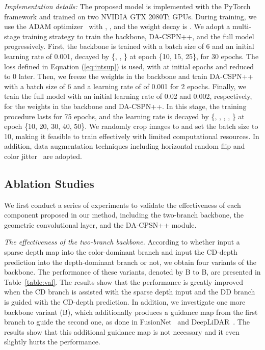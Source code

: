 \documentclass[letterpaper, 10 pt, conference]{ieeeconf}
\begin{document}
\textit{Implementation details:} The proposed model is implemented with the PyTorch~\cite{PyTorch} framework and trained on two NVIDIA GTX 2080Ti GPUs. During training, we use the ADAM optimizer~\cite{adam} with , , and the weight decay is . We adopt a multi-stage training strategy to train the backbone, DA-CSPN++, and the full model progressively. First, the backbone is trained with a batch size of 6 and an initial learning rate of 0.001, decayed by \{, , \} at epoch \{10, 15, 25\}, for 30 epochs. The loss defined in Equation (\ref{eq:intsup}) is used, with  at initial epochs and reduced to 0 later. Then, we freeze the weights in the backbone and train DA-CSPN++ with a batch size of 6 and a learning rate of of 0.001 for 2 epochs. Finally, we train the full model with an initial learning rate of 0.02 and 0.002, respectively, for the weights in the backbone and DA-CSPN++. In this stage, the training procedure lasts for 75 epochs, and the learning rate is decayed by \{, , , , \} at epoch \{10, 20, 30, 40, 50\}. We randomly crop images to  and set the batch size to 10, making it feasible to train effectively with limited computational resources. In addition, data augmentation techniques including horizontal random flip and color jitter~\cite{s2d} are adopted. 













\subsection{Ablation Studies}
We first conduct a series of experiments to validate the effectiveness of each component proposed in our method, including the two-branch backbone, the geometric convolutional layer, and the DA-CPSN++ module.


\textit{The effectiveness of the two-branch backbone.} According to whether input a sparse depth map into the color-dominant branch and input the CD-depth prediction into the depth-dominant branch or not, we obtain four variants of the backbone. The performance of these variants, denoted by B to B, are presented in Table~\ref{table:val}. The results show that the performance is greatly improved when the CD branch is assisted with the sparse depth input and the DD branch is guided with the CD-depth prediction. In addition, we investigate one more backbone variant (B), which additionally produces a guidance map from the first branch to guide the second one, as done in FusionNet~\cite{Gansbeke2019} and DeepLiDAR~\cite{Qiu2019deeplidar}. The results show that this additional guidance map is not necessary and it even slightly hurts the performance. 
\end{document}
